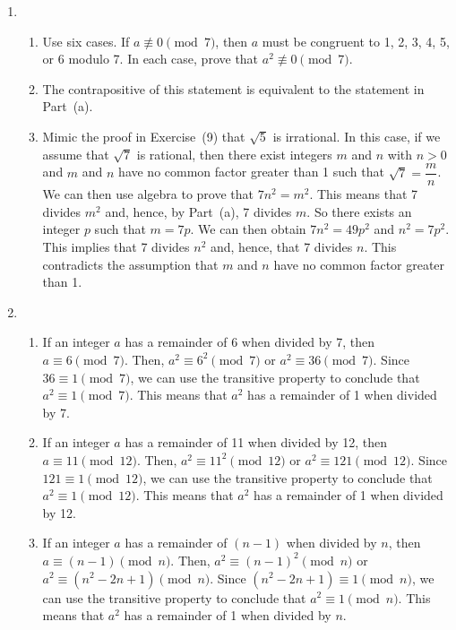 \begin{enumerate}
\item \begin{enumerate}
\item Use six cases.  If $a \not\equiv 0 \pmod 7$, then $a$ must be congruent to 1, 2, 3, 4, 5, or 6 modulo 7.  In each case, prove that $a^2 \not\equiv 0 \pmod 7$.

\item The contrapositive of this statement is equivalent to the statement in Part~(a).

\item Mimic the proof in Exercise~(9) that $\sqrt{5}$ is irrational.  In this case, if we assume that $\sqrt{7}$ is rational, then there exist integers $m$ and $n$ with $n > 0$ and $m$ and $n$ have no common factor greater than 1 such that $\sqrt{7} = \dfrac{m}{n}$.  We can then use algebra to prove that $7n^2 = m^2$.  This means that 7 divides $m^2$ and, hence, by Part~(a), 7 divides $m$.  So there exists an integer $p$ such that $m = 7p$.  We can then obtain 
$7n^2 = 49p^2$ and $n^2 = 7p^2$.  This implies that 7 divides $n^2$ and, hence, that 7 divides 
$n$.  This contradicts the assumption that $m$ and $n$ have no common factor greater than 1.
\end{enumerate}


\item \begin{enumerate}
\item If an integer $a$ has a remainder of 6 when divided by 7, then $a \equiv 6 \pmod 7$.  Then, $a^2 \equiv 6^2 \pmod 7$ or $a^2 \equiv 36 \pmod 7$.  Since $36 \equiv 1 \pmod 7$, we can use the transitive property to conclude that $a^2 \equiv 1 \pmod 7$.  This means that $a^2$ has a remainder of 1 when divided by 7.

\item If an integer $a$ has a remainder of 11 when divided by 12, then $a \equiv 11 \pmod 12$.  Then, $a^2 \equiv 11^2 \pmod 12$ or $a^2 \equiv 121 \pmod 12$.  Since $121 \equiv 1 \pmod 12$, we can use the transitive property to conclude that $a^2 \equiv 1 \pmod 12$.  This means that 
$a^2$ has a remainder of 1 when divided by 12.

\item If an integer $a$ has a remainder of $(n - 1)$ when divided by $n$, then 
$a \equiv (n - 1) \pmod n$.  Then, $a^2 \equiv (n - 1)^2 \pmod n$ or 
$a^2 \equiv (n^2 - 2n + 1) \pmod n$.  Since $(n^2 - 2n + 1) \equiv 1 \pmod n$, we can use the transitive property to conclude that $a^2 \equiv 1 \pmod n$.  This means that $a^2$ has a remainder of 1 when divided by $n$.
\end{enumerate}



\end{enumerate}
